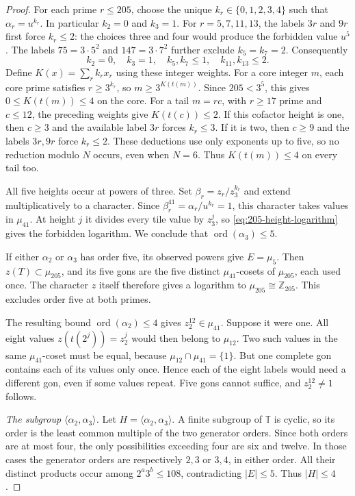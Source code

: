 \documentclass[11pt,reqno]{amsart}
\newcommand{\Z}{\mathbb Z}
\newcommand{\T}{\mathbb T}
\theoremstyle{definition}
\theoremstyle{remark}
\numberwithin{equation}{section}
\begin{document}
\begin{proof}
For each prime $r\le205$, choose the unique $k_r\in\{0,1,2,3,4\}$
such that $\alpha_r=u^{k_r}$. In particular $k_2=0$ and $k_3=1$.
For $r=5,7,11,13$, the labels $3r$ and $9r$ first force $k_r\le2$:
the choices three and four would produce the forbidden value $u^5$.
The labels $75=3\cdot5^2$ and $147=3\cdot7^2$ further exclude
$k_5=k_7=2$. Consequently
\[
 k_2=0,\quad k_3=1,\quad k_5,k_7\le1,\quad
 k_{11},k_{13}\le2.
\]
Define $K(x)=\sum_r k_rx_r$ using these integer weights.
For a core integer $m$, each core prime satisfies $r\ge3^{k_r}$,
so $m\ge3^{K(t(m))}$. Since $205<3^5$, this gives
$0\le K(t(m))\le4$ on the core.
For a tail $m=rc$, with $r\ge17$ prime and $c\le12$, the preceding
weights give $K(t(c))\le2$. If this cofactor height is one, then
$c\ge3$ and the available label $3r$ forces $k_r\le3$.
If it is two, then $c\ge9$ and the labels $3r,9r$ force $k_r\le2$.
These deductions use only exponents up to five, so no reduction modulo
$N$ occurs, even when $N=6$. Thus $K(t(m))\le4$ on every tail too.

All five heights occur at powers of three. Set
$\beta_r=z_r/z_3^{k_r}$ and extend multiplicatively to a character.
Since $\beta_r^{41}=\alpha_r/u^{k_r}=1$, this character takes values
in $\mu_{41}$. At height $j$ it divides every tile value by $z_3^j$,
so \eqref{eq:205-height-logarithm} gives the forbidden logarithm.
We conclude that $\operatorname{ord}(\alpha_3)\le5$.

If either $\alpha_2$ or $\alpha_3$ has order five, its observed powers
give $E=\mu_5$. Then $z(T)\subset\mu_{205}$, and its five gons are
the five distinct $\mu_{41}$-cosets of $\mu_{205}$, each used once.
The character $z$ itself therefore gives a logarithm to
$\mu_{205}\cong\Z_{205}$. This excludes order five at both primes.

The resulting bound $\operatorname{ord}(\alpha_2)\le4$ gives
$z_2^{12}\in\mu_{41}$. Suppose it were one. All eight values
$z(t(2^j))=z_2^j$ would then belong to $\mu_{12}$. Two such values in
the same $\mu_{41}$-coset must be equal, because
$\mu_{12}\cap\mu_{41}=\{1\}$. But one complete gon contains each
of its values only once. Hence each of the eight labels would need a
different gon, even if some values repeat. Five gons cannot suffice,
and $z_2^{12}\ne1$ follows.

\smallskip\noindent
\emph{The subgroup $\langle\alpha_2,\alpha_3\rangle$.}
Let $H=\langle\alpha_2,\alpha_3\rangle$. A finite subgroup of
$\T$ is cyclic, so its order is the least common multiple of the
two generator orders. Since both orders are at most four, the only
possibilities exceeding four are six and twelve. In those cases the
generator orders are respectively $2,3$ or $3,4$, in either order.
All their distinct products occur among $2^a3^b\le108$, contradicting
$|E|\le5$. Thus $|H|\le4$.


\end{proof}
\end{document}
